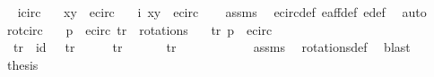\begin{isabellebody}
\endisatagproof
{\isafoldproof}%
%
\isadelimproof
\ \isanewline
%
\endisadelimproof
\isanewline
{}\isamarkupfalse%
\ i{\isacharunderscore}circ{\isacharcolon}\isanewline
\ \ \ {\isachardoublequoteopen}{\isacharparenleft}x{\isacharcomma}y{\isacharparenright}\ {\isasymin}\ e{\isacharunderscore}circ{\isachardoublequoteclose}\isanewline
\ \ \ {\isachardoublequoteopen}i\ {\isacharparenleft}x{\isacharcomma}y{\isacharparenright}\ {\isasymin}\ e{\isacharunderscore}circ{\isachardoublequoteclose}\isanewline
%
\isadelimproof
\ \ %
\endisadelimproof
%
\isatagproof
{}\isamarkupfalse%
\ assms\ \isamarkupfalse%
\ e{\isacharunderscore}circ{\isacharunderscore}def\ e{\isacharunderscore}aff{\isacharunderscore}def\ e{\isacharprime}{\isacharunderscore}def\ \isamarkupfalse%
\ auto%
\endisatagproof
{\isafoldproof}%
%
\isadelimproof
\isanewline
%
\endisadelimproof
\isanewline
{}\isamarkupfalse%
\ rot{\isacharunderscore}circ{\isacharcolon}\isanewline
\ \ \ {\isachardoublequoteopen}p\ {\isasymin}\ e{\isacharunderscore}circ{\isachardoublequoteclose}\ {\isachardoublequoteopen}tr\ {\isasymin}\ rotations{\isachardoublequoteclose}\isanewline
\ \ \ {\isachardoublequoteopen}tr\ p\ {\isasymin}\ e{\isacharunderscore}circ{\isachardoublequoteclose}\isanewline
%
\isadelimproof
%
\endisadelimproof
%
\isatagproof
{}\isamarkupfalse%
\ {\isacharminus}\isanewline
\ \ \isamarkupfalse%
\ {\isacharparenleft}{}{\isacharparenright}\ {\isachardoublequoteopen}tr\ {\isacharequal}\ id{\isachardoublequoteclose}\ {\isacharbar}\ {\isacharparenleft}{}{\isacharparenright}\ {\isachardoublequoteopen}tr\ {\isacharequal}\ {\isasymrho}{\isachardoublequoteclose}\ \ {\isacharbar}\ {\isacharparenleft}{}{\isacharparenright}\ {\isachardoublequoteopen}tr\ {\isacharequal}\ {\isasymrho}\ {\isasymcirc}\ {\isasymrho}{\isachardoublequoteclose}\ {\isacharbar}\ {\isacharparenleft}{}{\isacharparenright}\ {\isachardoublequoteopen}tr\ {\isacharequal}\ {\isasymrho}\ {\isasymcirc}\ {\isasymrho}\ {\isasymcirc}\ {\isasymrho}{\isachardoublequoteclose}\isanewline
\ \ \ \ \isamarkupfalse%
\ assms{\isacharparenleft}{}{\isacharparenright}\ \isamarkupfalse%
\ rotations{\isacharunderscore}def\ \isamarkupfalse%
\ blast\isanewline
\ \ \isamarkupfalse%
\ \isamarkupfalse%
\ {\isacharquery}thesis\ \isamarkupfalse%

\end{isabellebody}
